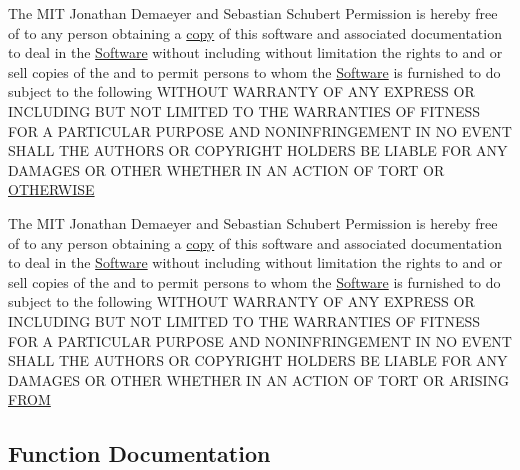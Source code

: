 \begin{DoxyCompactItemize}
The M\+IT Jonathan Demaeyer and Sebastian Schubert Permission is hereby free of to any person obtaining a \hyperlink{LICENSE_8txt_a51c339ce34cc545067d7d7c01c627159}{copy} of this software and associated documentation to deal in the \hyperlink{LICENSE_8txt_a5972617605af8d0ee35a18608e832e08}{Software} without including without limitation the rights to and or sell copies of the and to permit persons to whom the \hyperlink{LICENSE_8txt_a5972617605af8d0ee35a18608e832e08}{Software} is furnished to do subject to the following W\+I\+T\+H\+O\+UT W\+A\+R\+R\+A\+N\+TY OF A\+NY E\+X\+P\+R\+E\+SS OR I\+N\+C\+L\+U\+D\+I\+NG B\+UT N\+OT L\+I\+M\+I\+T\+ED TO T\+HE W\+A\+R\+R\+A\+N\+T\+I\+ES OF F\+I\+T\+N\+E\+SS F\+OR A P\+A\+R\+T\+I\+C\+U\+L\+AR P\+U\+R\+P\+O\+SE A\+ND N\+O\+N\+I\+N\+F\+R\+I\+N\+G\+E\+M\+E\+NT IN NO E\+V\+E\+NT S\+H\+A\+LL T\+HE A\+U\+T\+H\+O\+RS OR C\+O\+P\+Y\+R\+I\+G\+HT H\+O\+L\+D\+E\+RS BE L\+I\+A\+B\+LE F\+OR A\+NY D\+A\+M\+A\+G\+ES OR O\+T\+H\+ER W\+H\+E\+T\+H\+ER IN AN A\+C\+T\+I\+ON OF T\+O\+RT OR \hyperlink{LICENSE_8txt_a2d09f8d7fb0c021348af586f6580b73f}{O\+T\+H\+E\+R\+W\+I\+SE}
\item 
The M\+IT Jonathan Demaeyer and Sebastian Schubert Permission is hereby free of to any person obtaining a \hyperlink{LICENSE_8txt_a51c339ce34cc545067d7d7c01c627159}{copy} of this software and associated documentation to deal in the \hyperlink{LICENSE_8txt_a5972617605af8d0ee35a18608e832e08}{Software} without including without limitation the rights to and or sell copies of the and to permit persons to whom the \hyperlink{LICENSE_8txt_a5972617605af8d0ee35a18608e832e08}{Software} is furnished to do subject to the following W\+I\+T\+H\+O\+UT W\+A\+R\+R\+A\+N\+TY OF A\+NY E\+X\+P\+R\+E\+SS OR I\+N\+C\+L\+U\+D\+I\+NG B\+UT N\+OT L\+I\+M\+I\+T\+ED TO T\+HE W\+A\+R\+R\+A\+N\+T\+I\+ES OF F\+I\+T\+N\+E\+SS F\+OR A P\+A\+R\+T\+I\+C\+U\+L\+AR P\+U\+R\+P\+O\+SE A\+ND N\+O\+N\+I\+N\+F\+R\+I\+N\+G\+E\+M\+E\+NT IN NO E\+V\+E\+NT S\+H\+A\+LL T\+HE A\+U\+T\+H\+O\+RS OR C\+O\+P\+Y\+R\+I\+G\+HT H\+O\+L\+D\+E\+RS BE L\+I\+A\+B\+LE F\+OR A\+NY D\+A\+M\+A\+G\+ES OR O\+T\+H\+ER W\+H\+E\+T\+H\+ER IN AN A\+C\+T\+I\+ON OF T\+O\+RT OR A\+R\+I\+S\+I\+NG \hyperlink{LICENSE_8txt_a865c822002b6ef9423cdcedd61206bb6}{F\+R\+OM}
\end{DoxyCompactItemize}


\subsection{Function Documentation}
